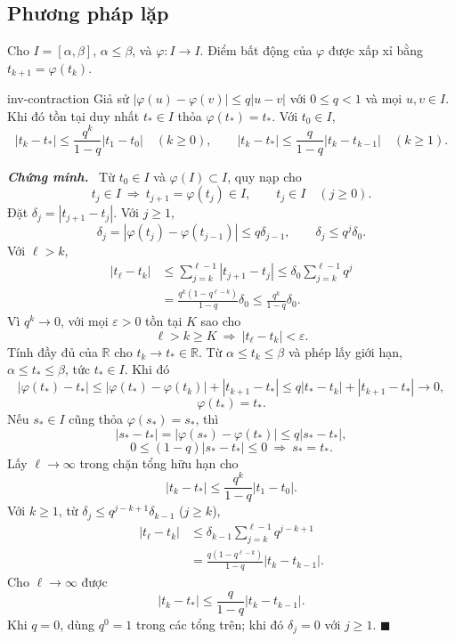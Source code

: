 \documentclass[12pt,a4paper,oneside]{book}
\numberwithin{algorithm}{chapter}
\theoremstyle{definition}
\newenvironment{chungminh}{\par\medskip\noindent\textbf{\textit{\color{mainblue}Chứng minh.}}\ }{\hfill$\blacksquare$\par\medskip}
\newcommand{\R}{\mathbb{R}}
\begin{document}
\subsection{Phương pháp lặp}
Cho $I=[\alpha,\beta]$, $\alpha\leq\beta$, và $\varphi:I\to I$. Điểm bất động của $\varphi$ được xấp xỉ bằng $t_{k+1}=\varphi(t_k)$.
\begin{dinhly}{}{inv-contraction}
Giả sử $|\varphi(u)-\varphi(v)|\leq q|u-v|$ với $0\leq q<1$ và mọi $u,v\in I$. Khi đó tồn tại duy nhất $t_\ast\in I$ thỏa $\varphi(t_\ast)=t_\ast$. Với $t_0\in I$,
\begin{equation}\label{eq:inv-iteration-bound}
 |t_k-t_\ast|\leq\frac{q^k}{1-q}|t_1-t_0|\quad(k\geq0),\qquad
 |t_k-t_\ast|\leq\frac{q}{1-q}|t_k-t_{k-1}|\quad(k\geq1).
\end{equation}
\end{dinhly}
\begin{chungminh}
Từ $t_0\in I$ và $\varphi(I)\subset I$, quy nạp cho
\[
 t_j\in I\ \Longrightarrow\ t_{j+1}=\varphi(t_j)\in I,
 \qquad t_j\in I\quad(j\geq0).
\]
Đặt $\delta_j=|t_{j+1}-t_j|$. Với $j\geq1$,
\[
 \delta_j=|\varphi(t_j)-\varphi(t_{j-1})|
 \leq q\delta_{j-1},\qquad
 \delta_j\leq q^j\delta_0.
\]
Với $\ell>k$,
\begin{align*}
 |t_\ell-t_k|
 &\leq\sum_{j=k}^{\ell-1}|t_{j+1}-t_j|
 \leq\delta_0\sum_{j=k}^{\ell-1}q^j\\
 &=\frac{q^k(1-q^{\ell-k})}{1-q}\delta_0
 \leq\frac{q^k}{1-q}\delta_0.
\end{align*}
Vì $q^k\to0$, với mọi $\varepsilon>0$ tồn tại $K$ sao cho
\[
 \ell>k\geq K\ \Longrightarrow\ |t_\ell-t_k|<\varepsilon.
\]
Tính đầy đủ của $\R$ cho $t_k\to t_\ast\in\R$. Từ
$\alpha\leq t_k\leq\beta$ và phép lấy giới hạn,
$\alpha\leq t_\ast\leq\beta$, tức $t_\ast\in I$. Khi đó
\[
 |\varphi(t_\ast)-t_\ast|
 \leq|\varphi(t_\ast)-\varphi(t_k)|+|t_{k+1}-t_\ast|
 \leq q|t_\ast-t_k|+|t_{k+1}-t_\ast|\longrightarrow0,
\]
\[
 \varphi(t_\ast)=t_\ast.
\]
Nếu $s_\ast\in I$ cũng thỏa $\varphi(s_\ast)=s_\ast$, thì
\[
 |s_\ast-t_\ast|
 =|\varphi(s_\ast)-\varphi(t_\ast)|\leq q|s_\ast-t_\ast|,
\]
\[
 0\leq(1-q)|s_\ast-t_\ast|\leq0
 \ \Longrightarrow\ s_\ast=t_\ast.
\]
Lấy $\ell\to\infty$ trong chặn tổng hữu hạn cho
\[
 |t_k-t_\ast|\leq\frac{q^k}{1-q}|t_1-t_0|.
\]
Với $k\geq1$, từ $\delta_j\leq q^{j-k+1}\delta_{k-1}$ ($j\geq k$),
\begin{align*}
 |t_\ell-t_k|
 &\leq\delta_{k-1}\sum_{j=k}^{\ell-1}q^{j-k+1}\\
 &=\frac{q(1-q^{\ell-k})}{1-q}|t_k-t_{k-1}|.
\end{align*}
Cho $\ell\to\infty$ được
\[
 |t_k-t_\ast|\leq\frac q{1-q}|t_k-t_{k-1}|.
\]
Khi $q=0$, dùng $q^0=1$ trong các tổng trên; khi đó $\delta_j=0$ với $j\geq1$.
\end{chungminh}
\end{document}
